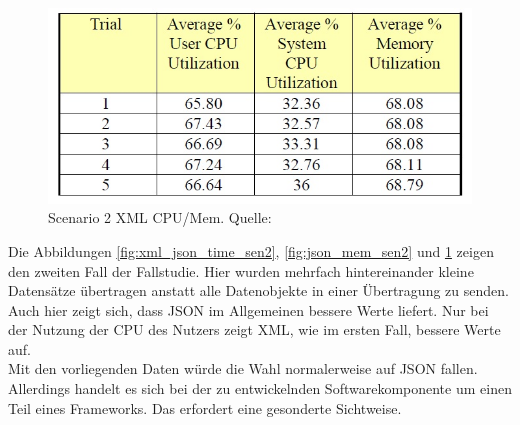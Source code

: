 \documentclass[a4paper]{article}
\begin{document}
	\begin{figure}[H] 
		\includegraphics[width=\linewidth]{../Bilder/xml_mem_sen2.jpg}
		\caption{Scenario 2 XML CPU/Mem. Quelle: \cite{XmlJson}}
		\label{fig:xml_mem_sen2}
	\end{figure}
	
	Die Abbildungen \ref{fig:xml_json_time_sen2}, \ref{fig:json_mem_sen2}
	und \ref{fig:xml_mem_sen2} zeigen den zweiten Fall der Fallstudie. Hier
	wurden mehrfach hintereinander kleine Datensätze übertragen anstatt alle
	Datenobjekte in einer Übertragung zu senden. Auch hier zeigt sich, dass
	JSON im Allgemeinen bessere Werte liefert. Nur bei der Nutzung der CPU des
	Nutzers zeigt XML, wie im ersten Fall, bessere Werte auf. \\
	 
	Mit den vorliegenden Daten würde die Wahl normalerweise auf JSON fallen.
	Allerdings handelt es sich bei der zu entwickelnden Softwarekomponente um
	einen Teil eines Frameworks. Das erfordert eine gesonderte Sichtweise. 
	
\end{document}
